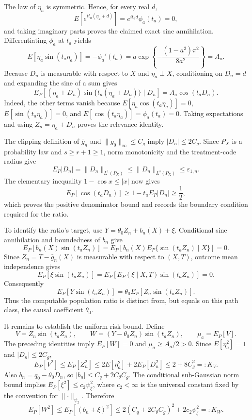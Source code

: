 The law of \(\eta_a\) is symmetric.  Hence, for every real \(d\),
\[
 E[e^{it_a(\eta_a+d)}]=e^{it_ad}\phi_a(t_a)=0,
\]
and taking imaginary parts proves the claimed exact sine annihilation.  Differentiating \(\phi_a\) at \(t_a\) yields
\[
 E[\eta_a\sin(t_a\eta_a)]
 =-\phi_a'(t_a)
 =a\exp\!\left\{-\frac{(1-a^2)\pi^2}{8a^2}\right\}=A_a.
\]
Because \(D_n\) is measurable with respect to \(X\) and \(\eta_a\perp X\), conditioning on \(D_n=d\) and expanding the sine of a sum gives
\[
 E_P[(\eta_a+D_n)\sin\{t_a(\eta_a+D_n)\}\mid D_n]
 =A_a\cos(t_aD_n).
\]
Indeed, the other terms vanish because \(E[\eta_a\cos(t_a\eta_a)]=0\), \(E[\sin(t_a\eta_a)]=0\), and \(E[\cos(t_a\eta_a)]=\phi_a(t_a)=0\).  Taking expectations and using \(Z_n=\eta_a+D_n\) proves the relevance identity.

The clipping definition of \(\bar g_n\) and \(\lVert g_0\rVert_\infty\le C_g\) imply \(\lvert D_n\rvert\le2C_g\).  Since \(P_X\) is a probability law and \(s\ge r+1\ge1\), norm monotonicity and the treatment-code radius give
\[
 E_P\lvert D_n\rvert=\lVert D_n\rVert_{L^1(P_X)}
 \le\lVert D_n\rVert_{L^s(P_X)}\le\varepsilon_{1,n}.
\]
The elementary inequality \(1-\cos x\le\lvert x\rvert\) now gives
\[
 E_P[\cos(t_aD_n)]
 \ge1-t_aE_P\lvert D_n\rvert\ge\frac12,
\]
which proves the positive denominator bound and records the boundary condition required for the ratio.

To identify the ratio's target, use \(Y=\theta_0Z_n+b_n(X)+\xi\).  Conditional sine annihilation and boundedness of \(b_n\) give
\[
 E_P[b_n(X)\sin(t_aZ_n)]
 =E_P\!\left[b_n(X)E_P\{\sin(t_aZ_n)\mid X\}\right]=0.
\]
Since \(Z_n=T-\bar g_n(X)\) is measurable with respect to \((X,T)\), outcome mean independence gives
\[
 E_P[\xi\sin(t_aZ_n)]
 =E_P\!\left[E_P(\xi\mid X,T)\sin(t_aZ_n)\right]=0.
\]
Consequently
\[
 E_P[Y\sin(t_aZ_n)]
 =\theta_0E_P[Z_n\sin(t_aZ_n)].
\]
Thus the computable population ratio is distinct from, but equals on this path class, the causal coefficient \(\theta_0\).

It remains to establish the uniform risk bound.  Define
\[
 V=Z_n\sin(t_aZ_n),\qquad
 W=(Y-\theta_0Z_n)\sin(t_aZ_n),\qquad
 \mu_a=E_P[V].
\]
The preceding identities imply \(E_P[W]=0\) and \(\mu_a\ge A_a/2>0\).  Since \(E[\eta_a^2]=1\) and \(\lvert D_n\rvert\le2C_g\),
\[
 E_P[V^2]\le E_P[Z_n^2]
 \le2E[\eta_a^2]+2E_P[D_n^2]\le2+8C_g^2=:K_V.
\]
Also \(b_n=q_0-\theta_0D_n\), so \(\lvert b_n\rvert\le C_q+2C_\theta C_g\).  The conditional sub-Gaussian norm bound implies \(E_P[\xi^2]\le c_2\psi_\xi^2\), where \(c_2<\infty\) is the universal constant fixed by the convention for \(\lVert\cdot\rVert_{\psi_2}\).  Therefore
\[
 E_P[W^2]
 \le E_P[(b_n+\xi)^2]
 \le2(C_q+2C_\theta C_g)^2+2c_2\psi_\xi^2=:K_W.
\]

